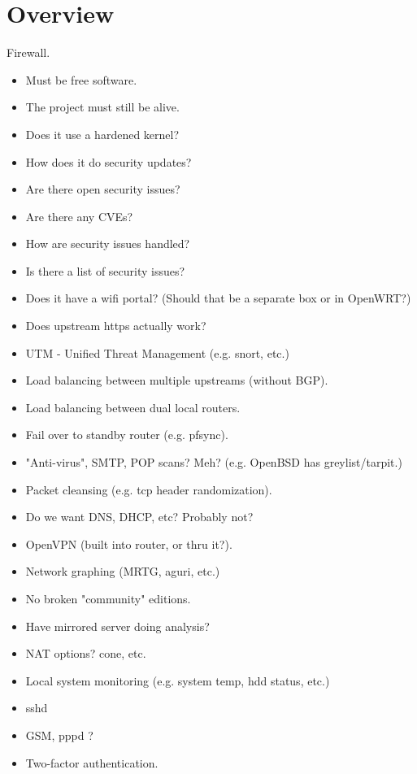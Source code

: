 %
%
%
%
%

\section{Overview}
Firewall.

\begin{itemize}
 \item Must be free software.
 \item The project must still be alive.
 \item Does it use a hardened kernel?
 \item How does it do security updates?
 \item Are there open security issues?
 \item Are there any CVEs?
 \item How are security issues handled?
 \item Is there a list of security issues?
 \item Does it have a wifi portal? (Should that be a separate box or in OpenWRT?)
 \item Does upstream https actually work?
 \item UTM - Unified Threat Management (e.g. snort, etc.)
 \item Load balancing between multiple upstreams (without BGP).
 \item Load balancing between dual local routers.
 \item Fail over to standby router (e.g. pfsync).
 \item "Anti-virus", SMTP, POP scans? Meh? (e.g. OpenBSD has greylist/tarpit.)
 \item Packet cleansing (e.g. tcp header randomization).
 \item Do we want DNS, DHCP, etc? Probably not?
 \item OpenVPN (built into router, or thru it?).
 \item Network graphing (MRTG, aguri, etc.)
 \item No broken "community" editions.
 \item Have mirrored server doing analysis?
 \item NAT options? cone, etc.
 \item Local system monitoring (e.g. system temp, hdd status, etc.)
 \item sshd
 \item GSM, pppd ?
 \item Two-factor authentication.
\end{itemize}

